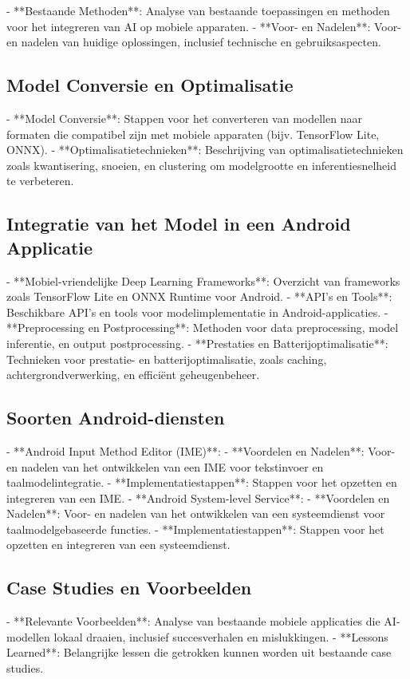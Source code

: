- **Bestaande Methoden**: Analyse van bestaande toepassingen en methoden voor het integreren van AI op mobiele apparaten.
- **Voor- en Nadelen**: Voor- en nadelen van huidige oplossingen, inclusief technische en gebruiksaspecten.

\subsection{Model Conversie en Optimalisatie}

- **Model Conversie**: Stappen voor het converteren van modellen naar formaten die compatibel zijn met mobiele apparaten (bijv. TensorFlow Lite, ONNX).
- **Optimalisatietechnieken**: Beschrijving van optimalisatietechnieken zoals kwantisering, snoeien, en clustering om modelgrootte en inferentiesnelheid te verbeteren.

\subsection{Integratie van het Model in een Android Applicatie}

- **Mobiel-vriendelijke Deep Learning Frameworks**: Overzicht van frameworks zoals TensorFlow Lite en ONNX Runtime voor Android.
- **API's en Tools**: Beschikbare API's en tools voor modelimplementatie in Android-applicaties.
- **Preprocessing en Postprocessing**: Methoden voor data preprocessing, model inferentie, en output postprocessing.
- **Prestaties en Batterijoptimalisatie**: Technieken voor prestatie- en batterijoptimalisatie, zoals caching, achtergrondverwerking, en efficiënt geheugenbeheer.

\subsection{Soorten Android-diensten}

- **Android Input Method Editor (IME)**:
- **Voordelen en Nadelen**: Voor- en nadelen van het ontwikkelen van een IME voor tekstinvoer en taalmodelintegratie.
- **Implementatiestappen**: Stappen voor het opzetten en integreren van een IME.
- **Android System-level Service**:
- **Voordelen en Nadelen**: Voor- en nadelen van het ontwikkelen van een systeemdienst voor taalmodelgebaseerde functies.
- **Implementatiestappen**: Stappen voor het opzetten en integreren van een systeemdienst.

\subsection{Case Studies en Voorbeelden}

- **Relevante Voorbeelden**: Analyse van bestaande mobiele applicaties die AI-modellen lokaal draaien, inclusief succesverhalen en mislukkingen.
- **Lessons Learned**: Belangrijke lessen die getrokken kunnen worden uit bestaande case studies.
